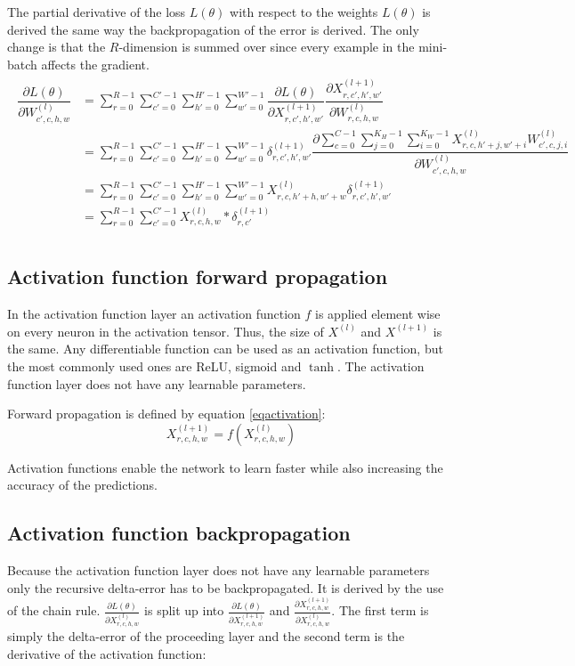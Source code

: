 \documentclass[a4paper, twoside]{article}
\newcommand*{\pd}[2]{\ensuremath{\dfrac{\partial #1}{\partial #2}}}
\newcommand*{\inpd}[2]{\ensuremath{\frac{\partial #1}{\partial #2}}}
\begin{document}
The partial derivative of the loss $L(\theta)$ with respect to the weights $L(\theta)$ is derived the same way the backpropagation of the error is derived. The only change is that the $R$-dimension is summed over since every example in the mini-batch affects the gradient. \cite{cs231n} \cite{webconv1} \cite{webconv2} \cite{webconv3} 
\begin{align}
\begin{split}
	\pd{L(\theta)}{W^{(l)}_{c',c,h,w}}
		& = \sum^{R-1}_{r=0} \sum^{C'-1}_{c'=0} \sum^{H'-1}_{h'=0} \sum^{W'-1}_{w'=0} \pd{L(\theta)}{X^{(l+1)}_{r,c',h',w'}} \pd{X^{(l+1)}_{r,c',h',w'}}{W^{(l)}_{r,c,h,w}} \\
		& = \sum^{R-1}_{r=0} \sum_{c'=0}^{C'-1} \sum^{H'-1}_{h'=0} \sum^{W'-1}_{w'=0} \delta^{(l+1)}_{r,c',h',w'} \pd{\sum\limits^{C-1}_{c=0} \sum\limits^{K_H-1}_{j=0} \sum\limits^{K_W-1}_{i=0} X^{(l)}_{r, c, h'+j, w'+i}W^{(l)}_{c', c, j, i}}{W^{(l)}_{c',c,h,w}} \\
		& = \sum^{R-1}_{r=0} \sum^{C'-1}_{c'=0} \sum^{H'-1}_{h'=0} \sum^{W'-1}_{w'=0} X^{(l)}_{r, c, h'+h, w'+w} \delta^{(l+1)}_{r,c',h',w'} \\
		& = \sum^{R-1}_{r=0} \sum^{C'-1}_{c'=0} X^{(l)}_{r, c, h, w} * \delta^{(l+1)}_{r,c'} \\
\end{split}
\end{align}

\subsection{Activation function forward propagation}
In the activation function layer an activation function $f$ is applied element wise on every neuron in the activation tensor. Thus, the size of $X^{(l)}$ and $X^{(l+1)}$ is the same. Any differentiable function can be used as an activation function, but the most commonly used ones are ReLU, sigmoid and $\tanh$. The activation function layer does not have any learnable parameters. \cite{convmath}
 
Forward propagation is defined by equation \eqref{eqactivation}:
\begin{equation}\label{eqactivation}
X^{(l+1)}_{r,c,h,w} = f(X^{(l)}_{r,c,h,w})
\end{equation}

Activation functions enable the network to learn faster while also increasing the accuracy of the predictions. \cite{cs231n}

\subsection{Activation function backpropagation}
Because the activation function layer does not have any learnable parameters only the recursive delta-error has to be backpropagated. It is derived by the use of the chain rule. $\inpd{L(\theta)}{X^{(l)}_{r,c,h,w}}$ is split up into $\inpd{L(\theta)}{X^{(l+1)}_{r,c,h,w}}$ and $\inpd{X^{(l+1)}_{r,c,h,w}}{X^{(l)}_{r,c,h,w}}$. The first term is simply the delta-error of the proceeding layer and the second term is the derivative of the activation function: \cite{cs231n} \cite{convmath}
\end{document}
